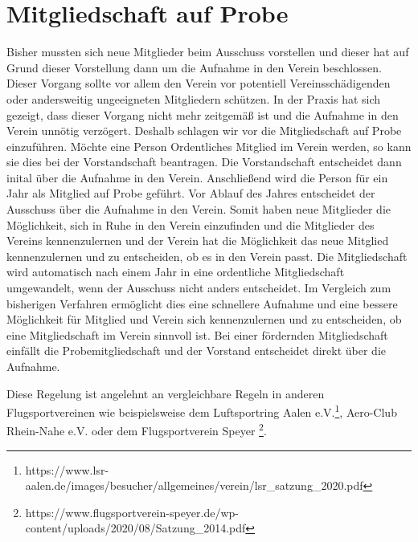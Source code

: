 \documentclass[10pt,a4paper,parskip=half]{scrartcl}
\begin{document}
  \section{Mitgliedschaft auf Probe}
  Bisher mussten sich neue Mitglieder beim Ausschuss vorstellen und dieser hat auf Grund dieser Vorstellung dann um die Aufnahme in den Verein beschlossen. Dieser Vorgang sollte vor allem den Verein vor potentiell Vereinsschädigenden oder andersweitig ungeeigneten Mitgliedern schützen. In der Praxis hat sich gezeigt, dass dieser Vorgang nicht mehr zeitgemäß ist und die Aufnahme in den Verein unnötig verzögert. Deshalb schlagen wir vor die Mitgliedschaft auf Probe einzuführen. Möchte eine Person Ordentliches Mitglied im Verein werden, so kann sie dies bei der Vorstandschaft beantragen. Die Vorstandschaft entscheidet dann inital über die Aufnahme in den Verein. Anschließend wird die Person für ein Jahr als Mitglied auf Probe geführt. Vor Ablauf des Jahres entscheidet der Ausschuss über die Aufnahme in den Verein. Somit haben neue Mitglieder die Möglichkeit, sich in Ruhe in den Verein einzufinden und die Mitglieder des Vereins kennenzulernen und der Verein hat die Möglichkeit das neue Mitglied kennenzulernen und zu entscheiden, ob es in den Verein passt. Die Mitgliedschaft wird automatisch nach einem Jahr in eine ordentliche Mitgliedschaft umgewandelt, wenn der Ausschuss nicht anders entscheidet. Im Vergleich zum bisherigen Verfahren ermöglicht dies eine schnellere Aufnahme und eine bessere Möglichkeit für Mitglied und Verein sich kennenzulernen und zu entscheiden, ob eine Mitgliedschaft im Verein sinnvoll ist. Bei einer fördernden Mitgliedschaft einfällt die Probemitgliedschaft und der Vorstand entscheidet direkt über die Aufnahme.

  Diese Regelung ist angelehnt an vergleichbare Regeln in anderen Flugsportvereinen wie beispielsweise dem Luftsportring Aalen e.V.\footnote{https://www.lsr-aalen.de/images/besucher/allgemeines/verein/lsr\_satzung\_2020.pdf}, Aero-Club Rhein-Nahe e.V. oder dem Flugsportverein Speyer \footnote{https://www.flugsportverein-speyer.de/wp-content/uploads/2020/08/Satzung\_2014.pdf}.
\end{document}
